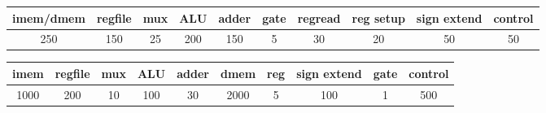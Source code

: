 \documentclass{article}
\begin{document}
    \begin{table}[ht]
        \centering
        \resizebox{\textwidth}{!}
        {\begin{tabular}{cccccccccc}
            \hline
            imem/dmem & regfile & mux & ALU & adder & gate & regread & reg setup & sign extend & control\\
            \hline
            250 & 150 & 25 & 200 & 150 & 5 & 30 & 20 & 50 & 50\\
            \hline
        \end{tabular}}
    \end{table}

    \begin{table}[ht]
        \centering
        \resizebox{\textwidth}{!}
        {\begin{tabular}{cccccccccc}
            \hline
            imem & regfile & mux & ALU & adder & dmem & reg & sign extend & gate & control\\
            \hline
            1000 & 200 & 10 & 100 & 30 & 2000 & 5 & 100 & 1 & 500\\
            \hline
        \end{tabular}}
    \end{table}
    
\end{document}
